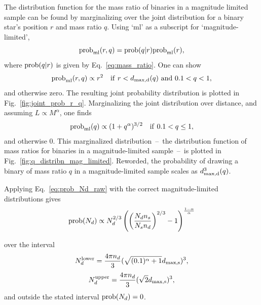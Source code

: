 \documentclass{emulateapj}
\begin{document}
The distribution function for the mass ratio of binaries in a magnitude 
limited sample can be found by marginalizing over the joint 
distribution for a binary star's position $r$ and mass ratio $q$.
Using `ml' as a subscript for `magnitude-limited',
\begin{equation}
{\rm prob}_{\rm ml}(r,q) = {\rm prob}(q|r){\rm prob}_{\rm ml}(r),
\end{equation} 
where ${\rm prob}(q|r)$ is given by Eq.~\ref{eq:mass_ratio}.
One can show
\begin{equation}
{\rm prob}_{\rm ml}(r,q) \propto r^2 \quad{\rm if}\ r<d_{\rm max,d}(q)\ {\rm 
and}\ 0.1<q<1, 
\end{equation}
and otherwise zero. The resulting joint probability distribution is plotted in 
Fig.~\ref{fig:joint_prob_r_q}.
Marginalizing the joint distribution over distance, and assuming $L\propto 
M^\alpha$, one finds
\begin{align}
{\rm prob}_{\rm ml}(q) \propto (1+q^\alpha)^{3/2}\quad {\rm if\ 
}0.1<q\leq 1,
\label{eq:pdf_q_mag_limited}
\end{align}
and otherwise 0.
This marginalized distribution~--~the distribution function of mass ratios for 
binaries in a magnitude-limited sample~--~is plotted in 
Fig.~\ref{fig:q_distribn_mag_limited}.
Reworded, the probability of drawing a binary of mass ratio 
$q$ in a magnitude-limited sample scales as $d_{\rm max,d}^3(q)$.

Applying Eq.~\ref{eq:prob_Nd_raw} with the correct magnitude-limited 
distributions gives
\begin{equation}
{\rm prob}(N_d) \propto N_d^{2/3} 
\left( \left(\frac{N_d n_s}{N_s n_d}\right)^{2/3} - 1
\right)^{\frac{1-\alpha}{\alpha}}
\end{equation}

over the interval
\begin{equation}
N_d^{\rm lower} = \frac{4 \pi n_d}{3} (\sqrt{(0.1)^\alpha + 1} d_{\rm 
max,s})^3,
\end{equation}
\begin{equation}
N_d^{\rm upper} = \frac{4 \pi n_d}{3} (\sqrt{2}d_{\rm max,s})^3,
\end{equation}
and outside the stated interval ${\rm prob}(N_d) = 0$.
\end{document}
